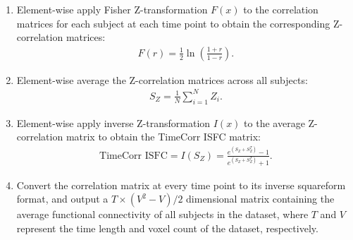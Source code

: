 \documentclass[11pt]{article}
\begin{document}
\begin{enumerate}
\begin{enumerate}
\end{enumerate}
\item Element-wise apply Fisher Z-transformation $F(x)$ to the correlation matrices for each subject at each time point to obtain the corresponding Z-correlation matrices:
\begin{align*}
F(r) = \frac{1}{2}\ln\left(\frac{1+r}{1-r}\right).
\end{align*}
\item Element-wise average the Z-correlation matrices across all subjects:
\begin{align*}
S_Z = \frac{1}{N}\sum^N_{i=1}Z_i.
\end{align*}
\item Element-wise apply inverse Z-transformation $I(x)$ to the average Z-correlation matrix to obtain the TimeCorr ISFC matrix:
\begin{align*}
\text{TimeCorr ISFC} = I(S_Z) = \frac{e^{(S_Z+S_Z^T)}-1}{e^{(S_Z+S_Z^T)}+1}.
\end{align*}
\item Convert the correlation matrix at every time point to its inverse squareform format, and output a $T \times (V^2-V)/2$ dimensional matrix containing the average functional connectivity of all subjects in the dataset, where $T$ and $V$ represent the time length and voxel count of the dataset, respectively.
\end{enumerate}
\end{document}
